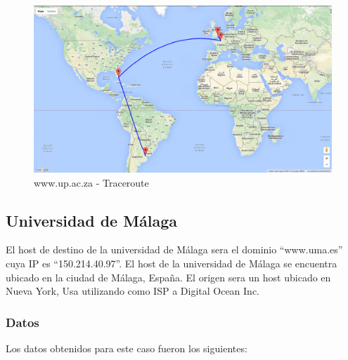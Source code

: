 \begin{figure}[H]
    \begin{center}
        \includegraphics[width=1\textwidth]{data/mapa-pretoria.png}
        \caption{www.up.ac.za - Traceroute}
        \label{mapa:pretoria}
    \end{center}
\end{figure}


\subsection{Universidad de M\'alaga}
El host de destino de la universidad de Málaga sera el dominio ``www.uma.es'' cuya IP es ``150.214.40.97''. El host de la universidad de M\'alaga se encuentra ubicado en la ciudad de M\'alaga, España. El origen sera un host ubicado en Nueva York, Usa utilizando como ISP a Digital Ocean Inc.


\subsubsection{Datos}

Los datos obtenidos para este caso fueron los siguientes:


